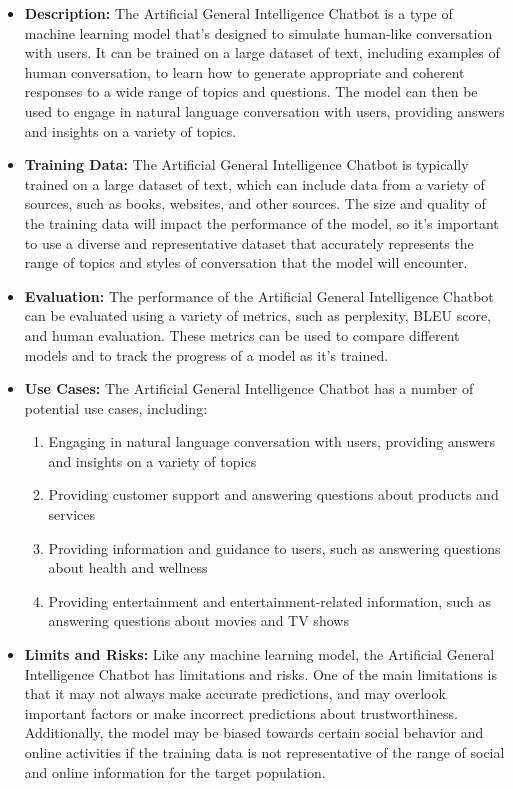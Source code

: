 \begin{itemize}
    \item \textbf{Description:} The Artificial General Intelligence Chatbot is a type of machine learning model that's designed to simulate human-like conversation with users. It can be trained on a large dataset of text, including examples of human conversation, to learn how to generate appropriate and coherent responses to a wide range of topics and questions. The model can then be used to engage in natural language conversation with users, providing answers and insights on a variety of topics.
    \item \textbf{Training Data:} The Artificial General Intelligence Chatbot is typically trained on a large dataset of text, which can include data from a variety of sources, such as books, websites, and other sources. The size and quality of the training data will impact the performance of the model, so it's important to use a diverse and representative dataset that accurately represents the range of topics and styles of conversation that the model will encounter.
    \item \textbf{Evaluation:} The performance of the Artificial General Intelligence Chatbot can be evaluated using a variety of metrics, such as perplexity, BLEU score, and human evaluation. These metrics can be used to compare different models and to track the progress of a model as it's trained.
    \item \textbf{Use Cases:} The Artificial General Intelligence Chatbot has a number of potential use cases, including:
        \begin{enumerate}  
            \item Engaging in natural language conversation with users, providing answers and insights on a variety of topics
            \item Providing customer support and answering questions about products and services
            \item Providing information and guidance to users, such as answering questions about health and wellness
            \item Providing entertainment and entertainment-related information, such as answering questions about movies and TV shows
        \end{enumerate}
    \item \textbf{Limits and Risks:} Like any machine learning model, the Artificial General Intelligence Chatbot has limitations and risks. One of the main limitations is that it may not always make accurate predictions, and may overlook important factors or make incorrect predictions about trustworthiness. Additionally, the model may be biased towards certain social behavior and online activities if the training data is not representative of the range of social and online information for the target population.

\end{itemize}
